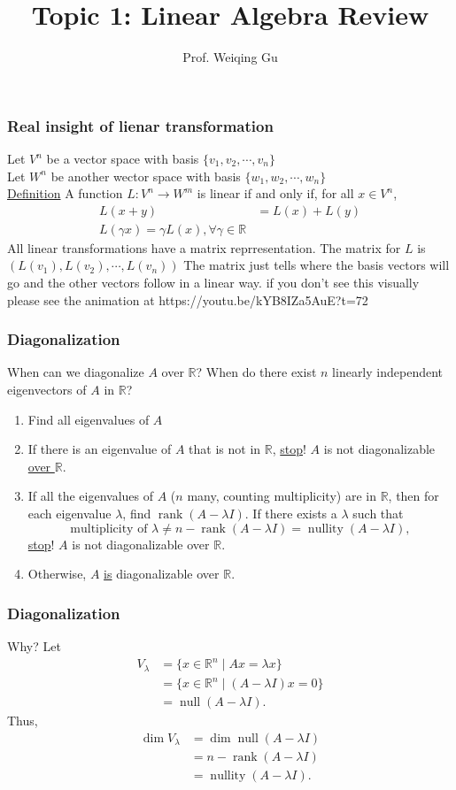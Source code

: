 \documentclass{beamer}
\title{Topic 1: Linear Algebra Review}
\author{Prof. Weiqing Gu}
\date{}
\institute{Math 142:\\Differential Geometry}
\theoremstyle{definition}
\newcommand{\R}{\mathbb{R}}
\renewcommand{\=}{&=&}
\newcommand{\<}{\langle}
\renewcommand{\>}{\rangle}
\DeclareMathOperator{\rk}{rank}
\DeclareMathOperator{\nullsp}{null}
\DeclareMathOperator{\nullity}{nullity}
\begin{document}
\begin{frame}[t]
\frametitle{Real insight of lienar transformation}
Let $V^n$ be a vector space with basis $\{ v_1, v_2, \cdots, v_n \}$ \\
Let $W^n$ be another wector space with basis $\{ w_1, w_2, \cdots, w_n \}$ \\

\underline{Definition} A function $L: V^n \rightarrow W^m$ is linear if and only if,
for all $x \in V^n$,
\begin{align*}
  L(x + y) &= L(x) + L(y) \\
  L(\gamma x) = \gamma L(x), \forall \gamma \in \mathbb{R}
\end{align*}
All linear transformations have a matrix reprresentation.
The matrix for $L$ is $(L(v_1), L(v_2), \cdots, L(v_n))$
The matrix just tells where the basis vectors will go and the other vectors
follow in a linear way. if you don't see this visually please see the animation
at https://youtu.be/kYB8IZa5AuE?t=72
\end{frame}

\begin{frame}[t]
\frametitle{Diagonalization}
\begin{block}{When can we diagonalize $A$ over $\R$?}
	When do there exist $n$ linearly independent eigenvectors of $A$ in $\R$?
	\pause
	\begin{enumerate}
		\item Find all eigenvalues of $A$
		\pause
		\item If there is an eigenvalue of $A$ that is not in $\R$, \underline{stop}! $A$ is not
		diagonalizable \underline{over $\R$}.
		\pause
		\item If all the eigenvalues of $A$ ($n$ many, counting multiplicity) are in $\R$, then 
		for each eigenvalue $\lambda$, find $\rk (A-\lambda I)$. \pause If there exists a 
		$\lambda$ such that
		\[
			\text{multiplicity of }\lambda \ne n - \rk(A-\lambda I) = \nullity(A-\lambda I),
		\]
		\underline{stop}! $A$ is not diagonalizable over $\R$.
		\pause
		\item Otherwise, $A$ \underline{is} diagonalizable over $\R$.
	\end{enumerate}
\end{block}
\end{frame}


\begin{frame}[t]
\frametitle{Diagonalization}
\begin{block}{Why?}
	Let
	\begin{align*}
		V_\lambda &= \{x \in \R^n \mid Ax = \lambda x \} \\
		&= \{x \in \R^n \mid (A-\lambda I)x = 0\} \\
		&= \nullsp(A-\lambda I).
	\end{align*}
	Thus, 
	\begin{align*}
		\dim V_\lambda &= \dim \nullsp(A-\lambda I) \\
		&= n-\rk(A-\lambda I) \\
		&= \nullity(A-\lambda I).
	\end{align*}
\end{block}
\end{frame}
\end{document}
